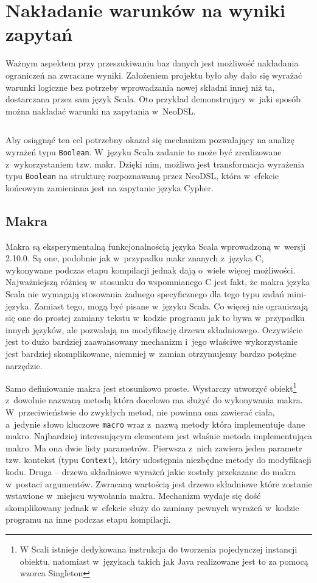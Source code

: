 \documentclass[brudnopis]{xmgr}
\begin{document}
\inputminted{cypher}{listings/cypher/patterns-dsl-example.cypher}

\section{Nakładanie warunków na wyniki zapytań}

Ważnym aspektem przy przeszukiwaniu baz danych jest możliwość nakładania ograniczeń na zwracane wyniki. Założeniem projektu było aby dało się wyrażać warunki logiczne bez potrzeby wprowadzania nowej składni innej niż ta, dostarczana przez sam język Scala. Oto przykład demonstrujący w~jaki sposób można nakładać warunki na zapytania w~NeoDSL.

\inputminted{scala}{listings/scala/dsl/query-with-simple-condition.scala}

Aby osiągnąć ten cel potrzebny okazał się mechanizm pozwalający na analizę wyrażeń typu \texttt{Boolean}. W~języku Scala zadanie to może być zrealizowane z~wykorzystaniem tzw. makr. 
Dzięki nim, możliwa jest transformacja wyrażenia typu \texttt{Boolean} na strukturę rozpoznawaną przez NeoDSL, która w~efekcie końcowym zamieniana jest na zapytanie języka Cypher.

\subsection{Makra}

Makra są eksperymentalną funkcjonalnością języka Scala wprowadzoną w~wersji 2.10.0. Są one, podobnie jak w~przypadku makr znanych z~języka C, wykonywane podczas etapu kompilacji jednak dają o~wiele więcej możliwości. Najważniejszą różnicą w~stosunku do wspomnianego C jest fakt, że makra języka Scala nie wymagają stosowania żadnego specyficznego dla tego typu zadań mini-języka. Zamiast tego, mogą być pisane w~języku Scala. Co więcej nie ograniczają się one do prostej zamiany tekstu w~kodzie programu jak to bywa w~przypadku innych języków, ale pozwalają na modyfikację drzewa składniowego. Oczywiście jest to dużo bardziej zaawansowany mechanizm i~jego właściwe wykorzystanie jest bardziej skomplikowane, niemniej w~zamian otrzymujemy bardzo potężne narzędzie.

Samo definiowanie makra jest stosunkowo proste. Wystarczy utworzyć obiekt\footnote{W Scali istnieje dedykowana instrukcja do tworzenia pojedynczej instancji obiektu, natomiast w~językach takich jak Java realizowane jest to za pomocą wzorca Singleton} z~dowolnie nazwaną metodą która docelowo ma służyć do wykonywania makra. W~przeciwieństwie do zwykłych metod, nie powinna ona zawierać ciała, a~jedynie słowo kluczowe \texttt{macro} wraz z~nazwą metody która implementuje dane makro. Najbardziej interesującym elementem jest właśnie metoda implementująca makro. Ma ona dwie listy parametrów. Pierwsza z~nich zawiera jeden parametr tzw. kontekst (typu \texttt{Context}), który udostępnia niezbędne metody do modyfikacji kodu. Druga --  drzewa składniowe wyrażeń jakie zostały przekazane do makra w~postaci argumentów. Zwracaną wartością jest drzewo składniowe które zostanie wstawione w~miejscu wywołania makra. Mechanizm wydaje się dość skomplikowany jednak w~efekcie służy do zamiany pewnych wyrażeń w~kodzie programu na inne podczas etapu kompilacji.
\end{document}
